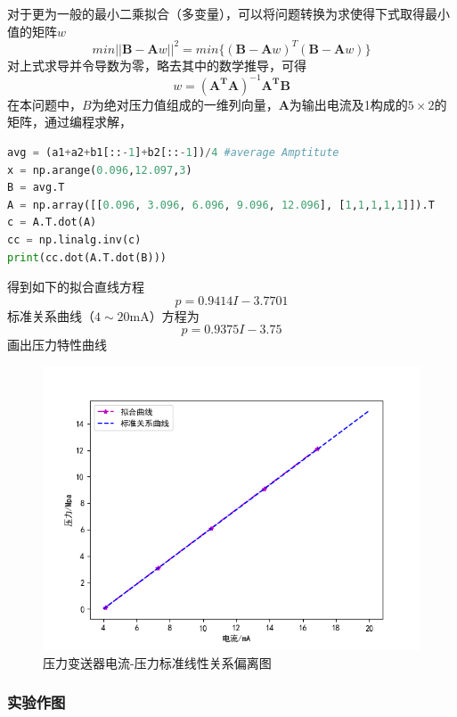 \documentclass[UTF8]{article}
\begin{document}
	对于更为一般的最小二乘拟合（多变量），可以将问题转换为求使得下式取得最小值的矩阵$w$
	\[
	min||\mathbf{B} - \mathbf{A}w||^2 = min\{(\mathbf{B} - \mathbf{A}w)^{T}(\mathbf{B} - \mathbf{A}w)\}
	\]
	对上式求导并令导数为零，略去其中的数学推导，可得
	\[
	w = (\mathbf{A^TA})^{-1}\mathbf{A^TB}
	\]
	在本问题中，$B$为绝对压力值组成的一维列向量，$\mathbf{A}$为输出电流及1构成的$5\times 2$的矩阵，通过编程求解，
	\begin{lstlisting}[language = python]
avg = (a1+a2+b1[::-1]+b2[::-1])/4 #average Amptitute
x = np.arange(0.096,12.097,3)
B = avg.T
A = np.array([[0.096, 3.096, 6.096, 9.096, 12.096], [1,1,1,1,1]]).T
c = A.T.dot(A)
cc = np.linalg.inv(c)
print(cc.dot(A.T.dot(B)))
	\end{lstlisting}
	得到如下的拟合直线方程
	\[
	p = 0.9414I - 3.7701
	\]
	标准关系曲线（$4 \sim 20$mA）方程为
	\[
	p = 0.9375I - 3.75
	\]
	画出压力特性曲线
	\begin{figure}[H]
		\centering
		\includegraphics[width=0.7\linewidth]{fig}
		\caption{压力变送器电流-压力标准线性关系偏离图}
		\label{fig:fig}
	\end{figure}
	
	\subsubsection{实验作图}
\end{document}
